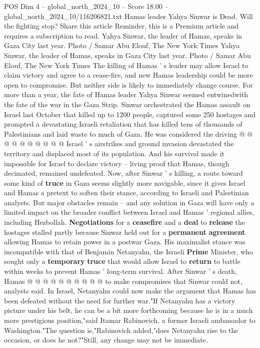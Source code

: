 \begin{textsample}{POS Dim 4 – global\_north\_2024\_10 – Score 18.00 – global\_north\_2024\_10/116206821.txt}  \label{ex:f4_pos_406}
Hamas leader Yahya Sinwar is Dead.
Will the fighting stop?
Share this article Reminder, this is a Premium article and requires a subscription to read.
Yahya Sinwar, the leader of Hamas, speaks in Gaza City last year.
Photo / Samar Abu Elouf, The New York Times Yahya Sinwar, the leader of Hamas, speaks in Gaza City last year.
Photo / Samar Abu Elouf, The New York Times The killing of Hamas ' s leader may allow Israel to claim victory and agree to a cease-fire, and new Hamas leadership could be more open to compromise.
But neither side is likely to immediately change course.
For more than a year, the fate of Hamas leader Yahya Sinwar seemed entwinedwith the fate of the war in the Gaza Strip.
Sinwar orchestrated the Hamas assault on Israel last October that killed up to 1200 people, captured some 250 hostages and prompted a devastating Israeli retaliation that has killed tens of thousands of Palestinians and laid waste to much of Gaza.
He was considered the driving @ @ @ @ @ @ @ @ @ @ Israel ' s airstrikes and ground invasion devastated the territory and displaced most of its population.
And his survival made it impossible for Israel to declare victory -- living proof that Hamas, though decimated, remained undefeated.
Now, after Sinwar ' s killing, a route toward some kind of \textbf{truce} in Gaza seems slightly more navigable, since it gives Israel and Hamas a pretext to soften their stance, according to Israeli and Palestinian analysts.
But major obstacles remain -- and any solution in Gaza will have only a limited impact on the broader conflict between Israel and Hamas ' regional allies, including Hezbollah. \textbf{Negotiations} for a \textbf{ceasefire} and a \textbf{deal} to \textbf{release} the hostages stalled partly because Sinwar held out for a \textbf{permanent} \textbf{agreement} allowing Hamas to retain power in a postwar Gaza.
His maximalist stance was incompatible with that of Benjamin Netanyahu, the Israeli \textbf{Prime} Minister, who sought only a \textbf{temporary} \textbf{truce} that would allow Israel to \textbf{return} to battle within weeks to prevent Hamas ' long-term survival.
After Sinwar ' s death, Hamas @ @ @ @ @ @ @ @ @ @ to make compromises that Sinwar could not, analysts said.
In Israel, Netanyahu could now make the argument that Hamas has been defeated without the need for further war."If Netanyahu has a victory picture under his belt, he can be a bit more forthcoming because he is in a much more prestigious position,"said Itamar Rabinovich, a former Israeli ambassador to Washington."The question is,"Rabinovich added,"does Netanyahu rise to the occasion, or does he not?"Still, any change may not be immediate.

\end{textsample}
